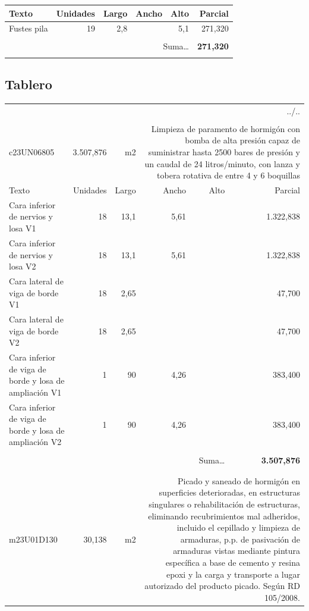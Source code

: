 \documentclass{book}%
\begin{document}
\begin{longtable}{lrrrrr}
Texto&Unidades&Largo&Ancho&Alto&Parcial\\%
\hline%
\multicolumn{1}{p{3.5cm}}{Fustes pila}&19&2,8&&5,1&   271,320\\%
&&&&&\\%
\multicolumn{5}{r}{Suma\ldots}&\textbf{   271,320}\\%
\hline%
&&&&&\\%
\end{longtable}%
\newpage

%
\subsection{Tablero}%
\begin{longtable}{lrrrrr}%
\multicolumn{6}{r}{../..}\\%
\endfoot%
\endlastfoot%
&&&&&\\%
c23UN06805& 3.507,876& m2&\multicolumn{3}{p{6cm}}{\scriptsize Limpieza de paramento de hormigón con bomba de alta presión capaz de suministrar hasta 2500 bares de presión y un caudal de 24 litros/minuto, con lanza y tobera rotativa de entre 4 y 6 boquillas\normalsize}\\%
Texto&Unidades&Largo&Ancho&Alto&Parcial\\%
\hline%
\multicolumn{1}{p{3.5cm}}{Cara inferior de nervios y losa V1}&18&13,1&5,61&& 1.322,838\\%
\multicolumn{1}{p{3.5cm}}{Cara inferior de nervios y losa V2}&18&13,1&5,61&& 1.322,838\\%
\multicolumn{1}{p{3.5cm}}{Cara lateral de viga de borde V1}&18&2,65&&&    47,700\\%
\multicolumn{1}{p{3.5cm}}{Cara lateral de viga de borde V2}&18&2,65&&&    47,700\\%
\multicolumn{1}{p{3.5cm}}{Cara inferior de viga de borde y losa de ampliación V1}&1&90&4,26&&   383,400\\%
\multicolumn{1}{p{3.5cm}}{Cara inferior de viga de borde y losa de ampliación V2}&1&90&4,26&&   383,400\\%
&&&&&\\%
\multicolumn{5}{r}{Suma\ldots}&\textbf{ 3.507,876}\\%
\hline%
&&&&&\\%
&&&&&\\%
m23U01D130&    30,138& m2&\multicolumn{3}{p{6cm}}{\scriptsize Picado y saneado de hormigón en superficies deterioradas, en estructuras singulares o rehabilitación de estructuras, eliminando recubrimientos mal adheridos, incluido el cepillado y limpieza de armaduras, p.p. de pasivación de armaduras vistas mediante pintura específica a base de cemento y resina epoxi y la carga y transporte a lugar autorizado del producto picado. Según RD 105/2008.\normalsize}\\%

\end{longtable}
\end{document}
